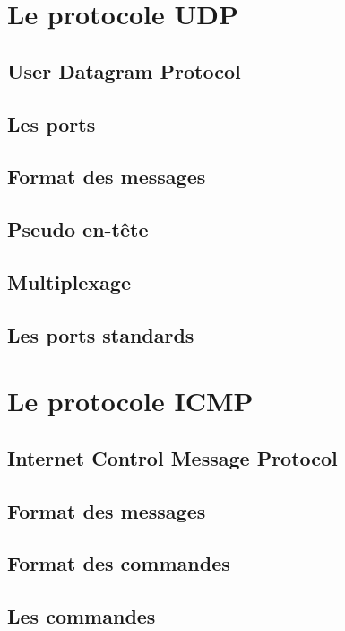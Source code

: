 \documentclass[12pt]{article}
\begin{document}
\section{Le protocole UDP}

\subsection{User Datagram Protocol}

\subsection{Les ports}

\subsection{Format des messages}

\subsection{Pseudo en-tête}

\subsection{Multiplexage}

\subsection{Les ports standards}


\section{Le protocole ICMP}


\subsection{Internet Control Message Protocol}

\subsection{Format des messages}

\subsection{Format des commandes}

\subsection{Les commandes}
\end{document}

